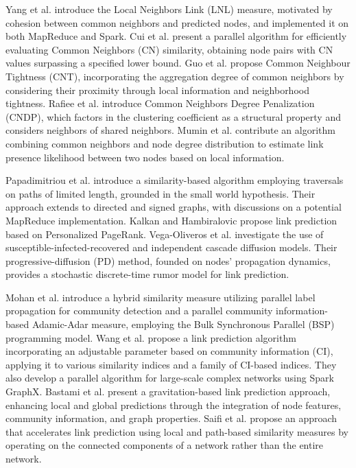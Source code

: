 Yang et al. \cite{yang2015new} introduce the Local Neighbors Link (LNL) measure, motivated by cohesion between common neighbors and predicted nodes, and implemented it on both MapReduce and Spark. Cui et al. \cite{cui2016bounded} present a parallel algorithm for efficiently evaluating Common Neighbors (CN) similarity, obtaining node pairs with CN values surpassing a specified lower bound. Guo et al. \cite{guo2019node} propose Common Neighbour Tightness (CNT), incorporating the aggregation degree of common neighbors by considering their proximity through local information and neighborhood tightness. Rafiee et al. \cite{rafiee2020cndp} introduce Common Neighbors Degree Penalization (CNDP), which factors in the clustering coefficient as a structural property and considers neighbors of shared neighbors. Mumin et al. \cite{mumin2022efficient} contribute an algorithm combining common neighbors and node degree distribution to estimate link presence likelihood between two nodes based on local information.

Papadimitriou et al. \cite{papadimitriou2012fast} introduce a similarity-based algorithm employing traversals on paths of limited length, grounded in the small world hypothesis. Their approach extends to directed and signed graphs, with discussions on a potential MapReduce implementation. Kalkan and Hambiralovic \cite{kalkanfinding} propose link prediction based on Personalized PageRank. Vega-Oliveros et al. \cite{vega2021link} investigate the use of susceptible-infected-recovered and independent cascade diffusion models. Their progressive-diffusion (PD) method, founded on nodes' propagation dynamics, provides a stochastic discrete-time rumor model for link prediction.

Mohan et al. \cite{mohan2017scalable} introduce a hybrid similarity measure utilizing parallel label propagation for community detection and a parallel community information-based Adamic-Adar measure, employing the Bulk Synchronous Parallel (BSP) programming model. Wang et al. \cite{wang2019link} propose a link prediction algorithm incorporating an adjustable parameter based on community information (CI), applying it to various similarity indices and a family of CI-based indices. They also develop a parallel algorithm for large-scale complex networks using Spark GraphX. Bastami et al. \cite{bastami2019gravitation} present a gravitation-based link prediction approach, enhancing local and global predictions through the integration of node features, community information, and graph properties. Saifi et al. \cite{saifi2023fast} propose an approach that accelerates link prediction using local and path-based similarity measures by operating on the connected components of a network rather than the entire network.

